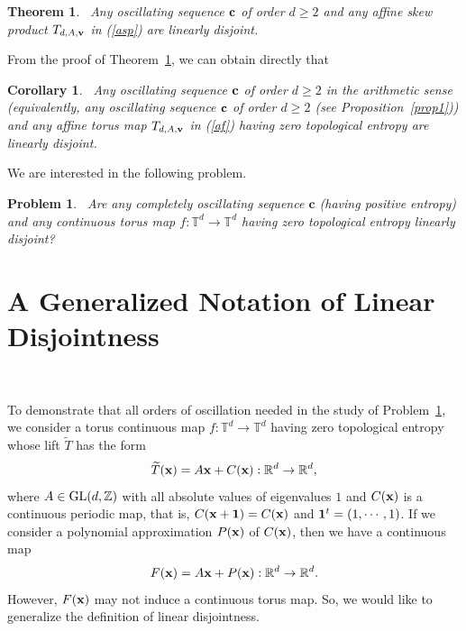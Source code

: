 \documentclass[12pt,letterpaper]{amsart}
\newtheorem {problem}{Problem}
\newtheorem{thmx}{Theorem}
\newtheorem{corx}{Corollary}
\newcommand {\Z} {{\mathbb Z}}
\begin{document}
\medskip
\begin{thmx}~\label{thma}
Any oscillating sequence ${\bf c}$ of order $d\geq 2$ and any affine skew product $T_{d, A, {\bf v}}$ in (\ref{asp}) are linearly disjoint. 
\end{thmx}

From the proof of Theorem~\ref{thma}, we can obtain directly that  

\medskip
\begin{corx}~\label{cora}
Any oscillating sequence ${\bf c}$ of order $d\geq 2$ in the arithmetic sense (equivalently, any oscillating sequence ${\bf c}$ of order $d\geq 2$ (see Proposition~\ref{prop1})) and any affine torus map
$T_{d, A,{\bf v}}$ in (\ref{af}) having zero topological entropy are linearly disjoint.
\end{corx}

We are interested in the following problem. 

\medskip
\begin{problem}~\label{gen}
Are any completely oscillating sequence ${\mathbf c}$ (having positive entropy) and any continuous torus map $f: {\mathbb T}^{d}\to {\mathbb T}^{d}$ having zero topological entropy linearly disjoint?
\end{problem}


\medskip
\medskip
\medskip

\section{A Generalized Notation of Linear Disjointness}~\label{gn}

To demonstrate that all orders of oscillation needed in the study of Problem~\ref{gen}, 
we consider a torus continuous map $f: {\mathbb T}^{d}\to {\mathbb T}^{d}$ having zero topological entropy whose lift $\widetilde{T}$ has the form 
$$
\widetilde{T} ({\bf x})= A{\bf x} +C({\bf x}): {\mathbb R}^{d}\to {\mathbb R}^{d},
$$
where $A\in {\rm GL}(d, \Z)$ with all absolute values of eigenvalues $1$ and $C({\bf x})$ is a continuous periodic map, that is, $C({\bf x}+{\bf 1})=C({\bf x})$ and ${\bf 1}^{t} =(1, \cdots, 1)$. If we consider a polynomial approximation
$P({\bf x})$ of $C({\bf x})$, then we have a continuous map
$$
F ({\bf x})= A{\bf x} +P({\bf x}): {\mathbb R}^{d}\to {\mathbb R}^{d}.
$$
However, $F({\bf x})$ may not induce a continuous torus map.
So, we would like to generalize the definition of linear disjointness.
\end{document}
